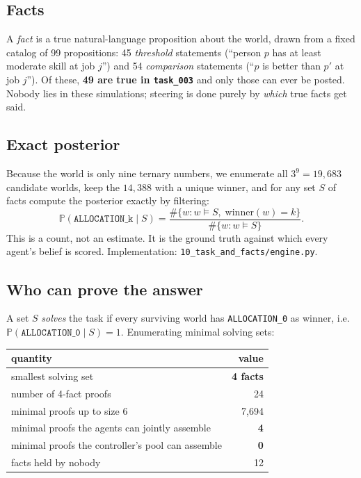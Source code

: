 \documentclass[11pt,a4paper]{article}
\newcommand{\Prob}{\mathbb{P}}
\newcommand{\A}[1]{\texttt{ALLOCATION\_#1}}
\begin{document}
\subsection{Facts}

A \emph{fact} is a true natural-language proposition about the world, drawn from
a fixed catalog of 99 propositions: 45 \emph{threshold} statements (``person $p$
has at least moderate skill at job $j$'') and 54 \emph{comparison} statements
(``$p$ is better than $p'$ at job $j$''). Of these, \textbf{49 are true in
\texttt{task\_003}} and only those can ever be posted. Nobody lies in these
simulations; steering is done purely by \emph{which} true facts get said.

\subsection{Exact posterior}

Because the world is only nine ternary numbers, we enumerate all
$3^9 = 19{,}683$ candidate worlds, keep the $14{,}388$ with a unique winner, and
for any set $S$ of facts compute the posterior exactly by filtering:
\begin{equation}
  \Prob(\A{k} \mid S) = \frac{\#\{w : w \models S,\; \text{winner}(w) = k\}}
                            {\#\{w : w \models S\}} .
  \label{eq:posterior}
\end{equation}
This is a count, not an estimate. It is the ground truth against which every
agent's belief is scored. Implementation: \texttt{10\_task\_and\_facts/engine.py}.

\subsection{Who can prove the answer}

A set $S$ \emph{solves} the task if every surviving world has \A{0} as winner,
i.e.\ $\Prob(\A{0} \mid S) = 1$. Enumerating minimal solving sets:

\begin{center}
\begin{tabular}{lr}
\toprule
quantity & value \\
\midrule
smallest solving set & \textbf{4 facts} \\
number of 4-fact proofs & 24 \\
minimal proofs up to size 6 & 7{,}694 \\
minimal proofs the agents can jointly assemble & \textbf{4} \\
minimal proofs the controller's pool can assemble & \textbf{0} \\
facts held by nobody & 12 \\
\bottomrule
\end{tabular}
\end{center}
\end{document}
